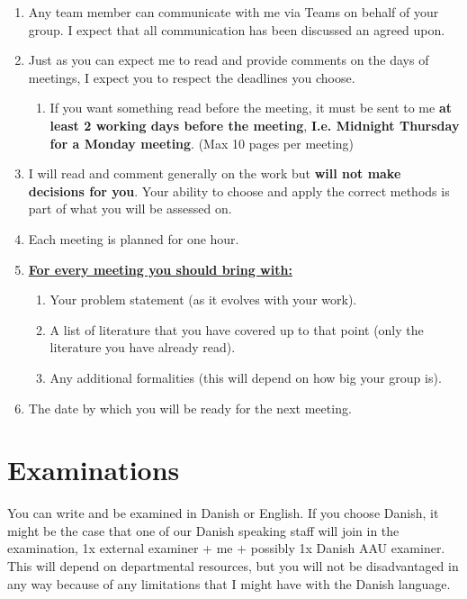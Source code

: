 \documentclass[
]{book}
\providecommand{\tightlist}{%
  \setlength{\itemsep}{0pt}\setlength{\parskip}{0pt}}
\begin{document}
\begin{enumerate}
\def\labelenumi{\arabic{enumi}.}
\item
  Any team member can communicate with me via Teams on behalf of your
  group. I expect that all communication has been discussed an
  agreed upon.
\item
  Just as you can expect me to read and provide comments on the days
  of meetings, I expect you to respect the deadlines you choose.

  \begin{enumerate}
  \def\labelenumii{\alph{enumii}.}
  \tightlist
  \item
    If you want something read before the meeting, it must be sent
    to me \textbf{at least 2 working days before the meeting}, \textbf{I.e.
    Midnight Thursday for a Monday meeting}. (Max 10 pages per
    meeting)
  \end{enumerate}
\item
  I will read and comment generally on the work but \textbf{will not make
  decisions for you}. Your ability to choose and apply the correct
  methods is part of what you will be assessed on.
\item
  Each meeting is planned for one hour.
\item
  \textbf{\underline{For every meeting you should bring with:}}

  \begin{enumerate}
  \def\labelenumii{\alph{enumii}.}
  \item
    Your problem statement (as it evolves with your work).
  \item
    A list of literature that you have covered up to that point
    (only the literature you have already read).
  \item
    Any additional formalities (this will depend on how big your
    group is).
  \end{enumerate}
\item
  The date by which you will be ready for the next meeting.
\end{enumerate}

\hypertarget{examinations}{%
\section{Examinations}\label{examinations}}

You can write and be examined in Danish or English. If you choose
Danish, it might be the case that one of our Danish speaking staff will
join in the examination, 1x external examiner + me + possibly 1x Danish
AAU examiner. This will depend on departmental resources, but you will
not be disadvantaged in any way because of any limitations that I might
have with the Danish language.
\end{document}
